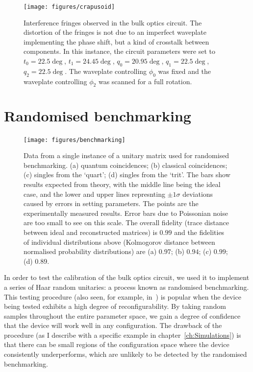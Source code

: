 \begin{figure}[t]
  \centering
  \texttt{[image: figures/crapusoid]}
  \caption[Interference fringes distorted by crosstalk between components]
  {Interference fringes observed in the bulk optics circuit. The distortion of
  the fringes is not due to an imperfect waveplate implementing the phase shift,
  but a kind of crosstalk between components. In this instance, the circuit
  parameters were set to \(t_{0}=22.5\deg\), \(t_{1}=24.45\deg\),
  \(q_{0}=20.95\deg\), \(q_{1}=22.5\deg\), \(q_{2}=22.5\deg\). The waveplate
  controlling \(\phi_{0}\) was fixed and the waveplate controlling \(\phi_{2}\)
  was scanned for a full rotation.}
  \label{fig:crapusoid}
\end{figure}

\section{Randomised benchmarking}
\label{sec:Benchmarking}
\begin{figure}[t]
  \texttt{[image: figures/benchmarking]}
  \caption[Sample data from randomised benchmarking]
  {Data from a single instance of a unitary matrix used for randomised
  benchmarking. (a) quantum coincidences; (b) classical coincidences; (c)
  singles from the `quart'; (d) singles from the `trit'. The bars show results 
  expected from theory, with the middle line being the ideal case, and the lower
  and upper lines represnting \(\pm 1\sigma\) deviations caused by errors in
  setting parameters. The points are the experimentally measured results. Error
  bars due to Poissonian noise are too small to see on this scale. The overall
  fidelity (trace distance between ideal and reconstructed matrices) is \(0.99\)
  and the fidelities of individual distributions above (Kolmogorov distance
  between normalised probability distributions) are (a) \(0.97\); (b) \(0.94\);
  (c) \(0.99\); (d) \(0.89\).}
  \label{fig:benchmarking}
\end{figure}
In order to test the calibration of the bulk optics circuit, we used it to
implement a series of Haar random unitaries: a process known as randomised
benchmarking. This testing procedure (also seen, for example,
in~\cite{peteschip}) is popular when the device being tested exhibits a high
degree of reconfigurability. By taking random samples throughout the entire
parameter space, we gain a degree of confidence that the device will work well
in any configuration. The drawback of the procedure (as I describe with a
specific example in chapter~\ref{ch:Simulations}) is that there can be small
regions of the configuration space where the device consistently
underperforms, which are unlikely to be detected by the randomised benchmarking.

